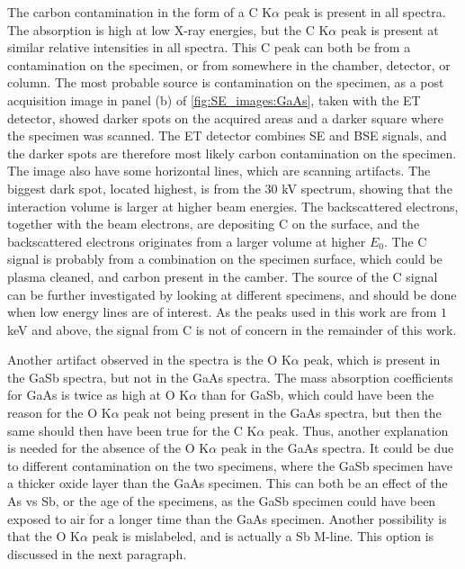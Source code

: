 The carbon contamination in the form of a C K$\alpha$ peak is present in all spectra.
The absorption is high at low X-ray energies, but the C K$\alpha$ peak is present at similar relative intensities in all spectra.
This C peak can both be from a contamination on the specimen, or from somewhere in the chamber, detector, or column.
The most probable source is contamination on the specimen, as a post acquisition image in panel (b) of \cref{fig:SE_images:GaAs}, taken with the ET detector, showed darker spots on the acquired areas and a darker square where the specimen was scanned.
The ET detector combines SE and BSE signals, and the darker spots are therefore most likely carbon contamination on the specimen.
The image also have some horizontal lines, which are scanning artifacts.
The biggest dark spot, located highest, is from the $30$ kV spectrum, showing that the interaction volume is larger at higher beam energies.
The backscattered electrons, together with the beam electrons, are depositing C on the surface, and the backscattered electrons originates from a larger volume at higher $E_0$.
The C signal is probably from a combination on the specimen surface, which could be plasma cleaned, and carbon present in the camber.
The source of the C signal can be further investigated by looking at different specimens, and should be done when low energy lines are of interest.
As the peaks used in this work are from $1$ keV and above, the signal from C is not of concern in the remainder of this work.


Another artifact observed in the spectra is the O K$\alpha$ peak, which is present in the GaSb spectra, but not in the GaAs spectra.
The mass absorption coefficients for GaAs is twice as high at O K$\alpha$ than for GaSb, which could have been the reason for the O K$\alpha$ peak not being present in the GaAs spectra, but then the same should then have been true for the C K$\alpha$ peak.
Thus, another explanation is needed for the absence of the O K$\alpha$ peak in the GaAs spectra.
It could be due to different contamination on the two specimens, where the GaSb specimen have a thicker oxide layer than the GaAs specimen.
This can both be an effect of the As vs Sb, or the age of the specimens, as the GaSb specimen could have been exposed to air for a longer time than the GaAs specimen.
Another possibility is that the O K$\alpha$ peak is mislabeled, and is actually a Sb M-line.
This option is discussed in the next paragraph.



